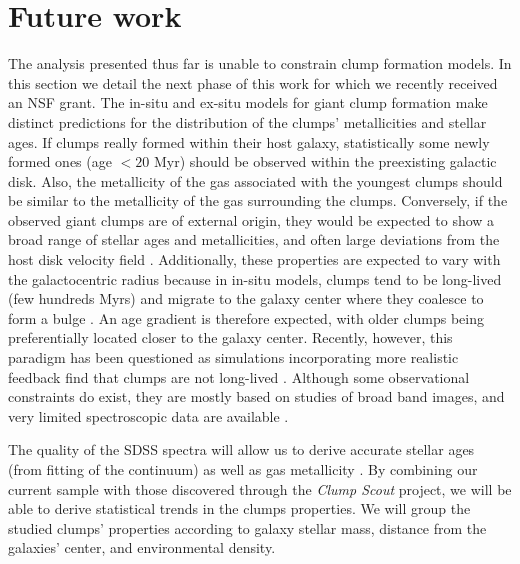 

\section{Future work}
\label{chap5: future}

The analysis presented thus far is unable to constrain clump formation models. In this section we detail the next phase of this work for which we recently received an NSF grant. 
The in-situ and ex-situ models for giant clump formation make distinct predictions for the distribution of the clumps’ metallicities and stellar ages. If clumps really formed within their host galaxy, statistically some newly formed ones (age $< 20$ Myr) should be observed within the preexisting galactic disk. Also, the metallicity of the gas associated with the youngest clumps should be similar to the metallicity of the gas surrounding the clumps. Conversely, if the observed giant clumps are of external origin, they would be expected to show a broad range of stellar ages and metallicities, and often large deviations from the host disk velocity field \citep{Bournaud2008,WuFoSch2012}. Additionally, these properties are expected to vary with the galactocentric radius because in in-situ models, clumps tend to be long-lived (few hundreds Myrs) and migrate to the galaxy center where they coalesce to form a bulge \citep{Bournaud2016}. An age gradient is therefore expected, with older clumps being preferentially located closer to the galaxy center. Recently, however, this paradigm has been questioned as simulations incorporating more realistic feedback find that clumps are not long-lived \citep{Genel2012,Hopkins2012,Oklopcic2017}. Although some observational constraints do exist, they are mostly based on studies of broad band images, and very limited spectroscopic data are available \citep{Guo2012,Zanella2015}. 

The quality of the SDSS spectra will allow us to derive accurate stellar ages (from fitting of the continuum) as well as gas metallicity \citep{Henry2015}. By combining our current sample with those discovered through the \textit{Clump Scout} project, we will be able to derive statistical trends in the clumps properties. We will group the studied clumps’ properties according to galaxy stellar mass, distance from the galaxies’ center, and environmental density. 


